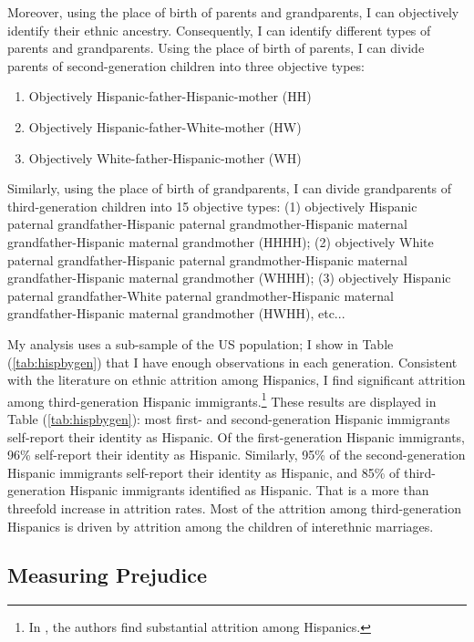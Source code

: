 \documentclass[12pt,english]{article}
\begin{document}
Moreover, using the place of birth of parents and grandparents, I can objectively identify their ethnic ancestry. Consequently, I can identify different types of parents and grandparents. Using the place of birth of parents, I can divide parents of second-generation children into three objective types: 
\begin{enumerate}
\item Objectively Hispanic-father-Hispanic-mother (HH)
\item Objectively Hispanic-father-White-mother (HW)
\item Objectively White-father-Hispanic-mother (WH)
\end{enumerate}

Similarly, using the place of birth of grandparents, I can divide grandparents of third-generation children into 15 objective types: (1) objectively Hispanic paternal grandfather-Hispanic paternal grandmother-Hispanic maternal grandfather-Hispanic maternal grandmother (HHHH); (2) objectively White paternal grandfather-Hispanic paternal grandmother-Hispanic maternal grandfather-Hispanic maternal grandmother (WHHH); (3) objectively Hispanic paternal grandfather-White paternal grandmother-Hispanic maternal grandfather-Hispanic maternal grandmother (HWHH), etc...

My analysis uses a sub-sample of the US population; I show in Table (\ref{tab:hispbygen}) that I have enough observations in each generation. Consistent with the literature on ethnic attrition among Hispanics, I find significant attrition among third-generation Hispanic immigrants.\footnote{In \textcite{duncanIdentifyingLaterGenerationDescendants2018,duncanSocioeconomicIntegrationImmigrant2018, antmanEthnicAttritionObserved2016,antmanEthnicAttritionAssimilation2020}, the authors find substantial attrition among Hispanics.} These results are displayed in Table (\ref{tab:hispbygen}): most first- and second-generation Hispanic immigrants self-report their identity as Hispanic. Of the first-generation Hispanic immigrants, 96\% self-report their identity as Hispanic. Similarly, 95\% of the second-generation Hispanic immigrants self-report their identity as Hispanic, and 85\% of third-generation Hispanic immigrants identified as Hispanic. That is a more than threefold increase in attrition rates. Most of the attrition among third-generation Hispanics is driven by attrition among the children of interethnic marriages.

\subsection{Measuring Prejudice}
\end{document}
